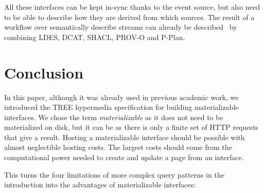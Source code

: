 \documentclass[
]{ceurart}
\begin{document}
All these interfaces can be kept in-sync thanks to the event source, but also need to be able to describe how they are derived from which sources.
The result of a workflow over semantically describe streams can already be described~\cite{vercruysse2022describing, guasch2022semantic} by combining LDES, DCAT, SHACL, PROV-O and P-Plan.

\section{Conclusion}

In this paper, although it was already used in previous academic work, we introduced the TREE hypermedia specification for building materializable interfaces.
We chose the term \textit{materializable} as it does not need to be materialized on disk, but it can be as there is only a finite set of HTTP requests that give a result.
Hosting a materializable interface should be possible with almost neglectible hosting costs.
The largest costs should come from the computational power needed to create and update a page from an interface.

This turns the four limitations of more complex query patterns in the introduction into the advantages of materializable interfaces:
\end{document}
